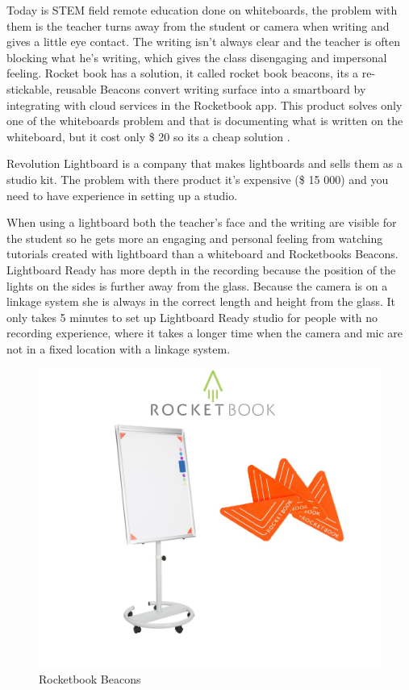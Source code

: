 \documentclass[a4paper]{jpconf}
\begin{document}
	Today is STEM field remote education done on whiteboards, the problem with them is the teacher turns away from the student or camera when writing and gives a little eye contact. The writing isn't always clear and the teacher is often blocking what he's writing, which gives the class disengaging and impersonal feeling. 
	Rocket book has a solution, it called rocket book beacons, its a re-stickable, reusable Beacons convert writing surface into a smartboard by integrating with cloud services in the Rocketbook app.
	This product solves only one of the whiteboards problem and that is documenting what is written on the whiteboard, but it cost only \$ 20 so its a cheap solution \cite{Rocketbook}.
	
	Revolution Lightboard is a company that makes lightboards and sells them as a studio kit. The problem with there product it's expensive (\$ 15 000) and you need to have experience in setting up a studio\cite{Revolution}.
	
	When using a lightboard both the teacher's face and the writing are visible for the student so he gets more an engaging and personal feeling from watching tutorials created with lightboard than a whiteboard and Rocketbooks Beacons.
	Lightboard Ready has more depth in the recording because the position of the lights on the sides is further away from the glass.
	Because the camera is on a linkage system she is always in the correct length and height from the glass.  
	It only takes 5 minutes to set up Lightboard Ready studio for people with no recording experience, where it takes a longer time when the camera and mic are not in a fixed location with a linkage system.
	
	
	

	\begin{figure}
		\centering
		\includegraphics[width=0.7\linewidth]{becons.png}
		\caption{Rocketbook Beacons \cite{Rocketbook}}
		\label{fig:ROCK}
	\end{figure}
	
\end{document}
